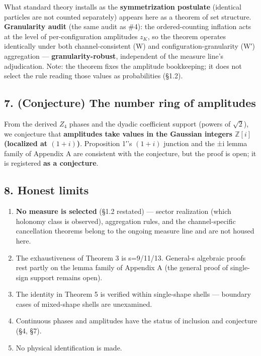 \documentclass[
]{article}
\providecommand{\tightlist}{%
  \setlength{\itemsep}{0pt}\setlength{\parskip}{0pt}}
\begin{document}
What standard theory installs as the \textbf{symmetrization postulate}
(identical particles are not counted separately) appears here as a
theorem of set structure. \textbf{Granularity audit} (the same audit as
\#4): the ordered-counting inflation acts at the level of
per-configuration amplitudes \(z_K\), so the theorem operates
identically under both channel-consistent (W) and
configuration-granularity (W′) aggregation ---
\textbf{granularity-robust}, independent of the measure line's
adjudication. Note: the theorem fixes the amplitude bookkeeping; it does
not select the rule reading those values as probabilities (§1.2).

\subsection{7. (Conjecture) The number ring of
amplitudes}\label{conjecture-the-number-ring-of-amplitudes}

From the derived \(Z_4\) phases and the dyadic coefficient support
(powers of \(\sqrt2\)), we conjecture that \textbf{amplitudes take
values in the Gaussian integers \(\mathbb{Z}[i]\) (localized at
\((1+i)\))}. Proposition 1′'s \((1+i)\) junction and the ±i lemma family
of Appendix A are consistent with the conjecture, but the proof is open;
it is registered \textbf{as a conjecture}.

\subsection{8. Honest limits}\label{honest-limits}

\begin{enumerate}
\def\labelenumi{\arabic{enumi}.}
\tightlist
\item
  \textbf{No measure is selected} (§1.2 restated) --- sector realization
  (which holonomy class is observed), aggregation rules, and the
  channel-specific cancellation theorems belong to the ongoing measure
  line and are not housed here.
\item
  The exhaustiveness of Theorem 3 is s=9/11/13. General-s algebraic
  proofs rest partly on the lemma family of Appendix A (the general
  proof of single-sign support remains open).
\item
  The identity in Theorem 5 is verified within single-shape shells ---
  boundary cases of mixed-shape shells are unexamined.
\item
  Continuous phases and amplitudes have the status of inclusion and
  conjecture (§4, §7).
\item
  No physical identification is made.
\end{enumerate}
\end{document}

